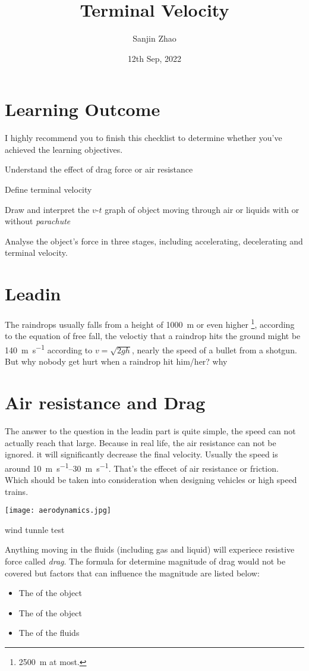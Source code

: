 \documentclass[a4paper]{tufte-handout}
\title{Terminal Velocity}
\author{Sanjin Zhao}
\date{12th Sep, 2022}  %
\begin{document}
\maketitle%
\section*{Learning Outcome}
I highly recommend you to finish this checklist to determine whether you've achieved the learning objectives.
\begin{todolist}
  \item Understand the effect of drag force or air resistance
  \item Define terminal velocity
  \item Draw and interpret the $v$-$t$ graph of object moving through air or liquids with or without \emph{parachute}
  \item Analyse the object's force in three stages, including accelerating, decelerating and terminal velocity.
\end{todolist}
\clearpage

\section{Leadin}
The raindrops usually falls from a height of \SI{1000}{\m} or even higher \footnote{\SI{2500}{\m} at most.}, according to the equation of free fall, the veloctiy that a raindrop hits the ground might be \SI{140}{\m\per\s} according to $v=\sqrt{2gh}$, nearly the speed of a bullet from a shotgun. But why nobody get hurt when a raindrop hit him/her? why

\section{Air resistance and Drag}
The answer to the question in the leadin part is quite simple, the speed can not actually reach that large. Because in real life, the air resistance can not be ignored. it will significantly decrease the final velocity. Usually the speed is around \SIrange{10}{30}{\m\per\s}. That's the effecet of air resistance or friction. Which should be taken into consideration when designing vehicles or high speed trains.
\begin{marginfigure}
\texttt{[image: aerodynamics.jpg]}
\caption{wind tunnle test}
\end{marginfigure}

Anything moving in the fluids (including gas and liquid) will experiece resistive force called \emph{drag}. The formula for determine magnitude of drag would not be covered but factors that can influence the magnitude are listed below:
\begin{itemize}
  \item The \uline{\hspace{0.5in}} of the object
  \item The \uline{\hspace{0.5in}} of the object
  \item The \uline{\hspace{1in}} of the fluids
\end{itemize}
\end{document}
